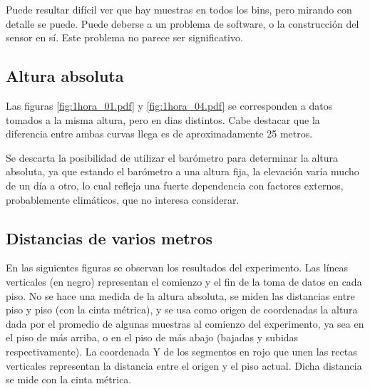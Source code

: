 \documentclass[main]{subfiles}
\begin{document}
Puede resultar difícil ver que hay muestras en todos los bins, pero mirando con detalle se puede. Puede deberse a un problema de software, o la construcción del sensor en sí. Este problema no parece ser significativo.

\subsection{Altura absoluta}

Las figuras \ref{fig:1hora_01.pdf} y \ref{fig:1hora_04.pdf} se corresponden a datos tomados a la misma altura, pero en dias distintos. Cabe destacar que la diferencia entre ambas curvas llega es de aproximadamente 25 metros.

Se descarta la posibilidad de utilizar el barómetro para determinar la altura absoluta, ya que estando el barómetro a una altura fija, la elevación varía mucho de un día a otro, lo cual refleja una fuerte dependencia con factores externos, probablemente climáticos, que no interesa considerar.

\subsection{Distancias de varios metros}

En las siguientes figuras se observan los resultados del experimento. Las líneas verticales (en negro) representan el comienzo y el fin de la toma de datos en cada piso. No se hace una medida de la altura absoluta, se miden las distancias entre piso y piso (con la cinta métrica), y se usa como origen de coordenadas la altura dada por el promedio de algunas muestras al comienzo del experimento, ya sea en el piso de más arriba, o en el piso de más abajo (bajadas y subidas respectivamente). La coordenada Y de los segmentos en rojo que unen las rectas verticales representan la distancia entre el origen y el piso actual. Dicha distancia se mide con la cinta métrica.
\end{document}
